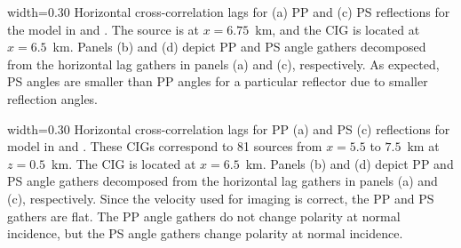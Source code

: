 

{width=0.30\textwidth} {Horizontal cross-correlation lags for (a) PP
and (c) PS reflections for the model in  and
. The source is at $x=6.75$~km, and the CIG is
located at $x=6.5$~km. Panels (b) and (d) depict PP and PS angle
gathers decomposed from the horizontal lag gathers in panels (a) and
(c), respectively. As expected, PS angles are smaller than PP angles
for a particular reflector due to smaller reflection angles.  }

 {width=0.30\textwidth}
{Horizontal cross-correlation lags for PP (a) and PS (c) reflections
for  model in  and
. These CIGs correspond to 81 sources from $x=5.5$
to $7.5$~km at $z=0.5$~km. The CIG is located at $x=6.5$~km. Panels
(b) and (d) depict PP and PS angle gathers decomposed from the
horizontal lag gathers in panels (a) and (c), respectively. Since the
velocity used for imaging is correct, the PP and PS gathers are
flat. The PP angle gathers do not change polarity at normal incidence,
but the PS angle gathers change polarity at normal incidence.}


